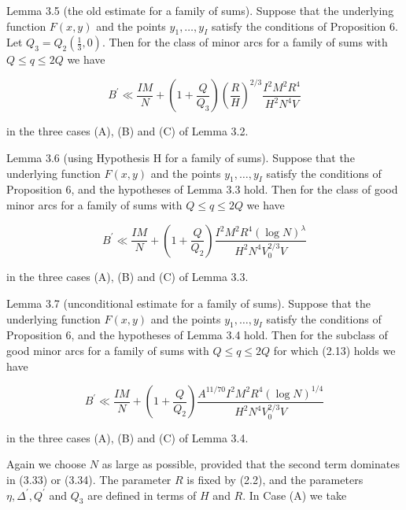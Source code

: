 \documentclass[10pt]{article}
\begin{document}
Lemma 3.5 (the old estimate for a family of sums). Suppose that the underlying function $F(x, y)$ and the points $y_{1}, \ldots, y_{I}$ satisfy the conditions of Proposition 6. Let $Q_{3}=Q_{2}\left(\frac{1}{3}, 0\right)$. Then for the class of minor arcs for a family of sums with $Q \leqslant q \leqslant 2 Q$ we have


\begin{equation*}
B^{\prime} \ll \frac{I M}{N}+\left(1+\frac{Q}{Q_{3}}\right)\left(\frac{R}{H}\right)^{2 / 3} \frac{I^{2} M^{2} R^{4}}{H^{2} N^{4} V} \tag{3.32}
\end{equation*}


in the three cases (A), (B) and (C) of Lemma 3.2.

Lemma 3.6 (using Hypothesis H for a family of sums). Suppose that the underlying function $F(x, y)$ and the points $y_{1}, \ldots, y_{I}$ satisfy the conditions of Proposition 6, and the hypotheses of Lemma 3.3 hold. Then for the class of good minor arcs for a family of sums with $Q \leqslant q \leqslant 2 Q$ we have


\begin{equation*}
B^{\prime} \ll \frac{I M}{N}+\left(1+\frac{Q}{Q_{2}}\right) \frac{I^{2} M^{2} R^{4}(\log N)^{\lambda}}{H^{2} N^{4} V_{0}^{2 / 3} V} \tag{3.33}
\end{equation*}


in the three cases (A), (B) and (C) of Lemma 3.3.

Lemma 3.7 (unconditional estimate for a family of sums). Suppose that the underlying function $F(x, y)$ and the points $y_{1}, \ldots, y_{I}$ satisfy the conditions of Proposition 6, and the hypotheses of Lemma 3.4 hold. Then for the subclass of good minor arcs for a family of sums with $Q \leqslant q \leqslant 2 Q$ for which (2.13) holds we have


\begin{equation*}
B^{\prime} \ll \frac{I M}{N}+\left(1+\frac{Q}{Q_{2}}\right) \frac{A^{11 / 70} I^{2} M^{2} R^{4}(\log N)^{1 / 4}}{H^{2} N^{4} V_{0}^{2 / 3} V} \tag{3.34}
\end{equation*}


in the three cases (A), (B) and (C) of Lemma 3.4.

Again we choose $N$ as large as possible, provided that the second term dominates in (3.33) or (3.34). The parameter $R$ is fixed by (2.2), and the parameters $\eta, \Delta^{\prime}, Q^{\prime}$ and $Q_{3}$ are defined in terms of $H$ and $R$. In Case (A) we take
\end{document}
